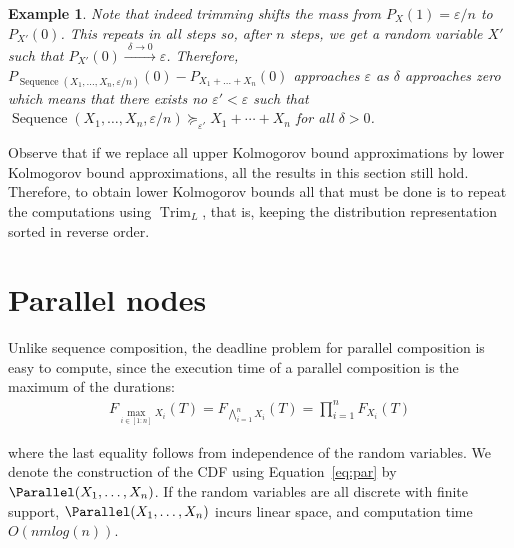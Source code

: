 \documentclass[review]{elsarticle}
\newtheorem{example}{Example}
\DeclareMathOperator{\Trim}{Trim}
\DeclareMathOperator{\Sequence}{Sequence}
\begin{document}
\begin{example}
	Note that indeed trimming shifts the mass from $P_X(1)=\varepsilon/n$ to $P_{X'}(0)$.
	This repeats in all steps so, after $n$ steps, we get a random variable $X'$ such that $P_{X'}(0) \xrightarrow{\,\,\delta \to 0\,\,} \varepsilon$. Therefore, 
	$P_{\Sequence(X_1,\dots,X_n,\varepsilon/n)}(0) {-} P_{X_1{+}\dots{+}X_n}(0)$
	approaches $\varepsilon$ as $\delta$ approaches zero
	which means that there exists no $\varepsilon' {<} \varepsilon$
	such that $\Sequence(X_1,\dots,X_n,\varepsilon/n) \succeq_{\varepsilon'} X_1 + \cdots + X_n$ for all $\delta >0$.
	
\end{example}

Observe that if we replace all upper Kolmogorov bound approximations by 
lower Kolmogorov bound approximations, all the results in this section
still hold. Therefore, to obtain lower Kolmogorov bounds all that must be
done is to repeat the computations using $\Trim_L$, that is, keeping
the distribution representation sorted in reverse order.


\section{Parallel nodes}\label{sec:par}


Unlike sequence composition, the deadline problem for parallel composition
is easy to compute, since the execution time of
a parallel composition is the maximum of the durations:
\begin{align}
F_{\max_{i\in[1:n]}X_i}(T)
{=}F_{\bigwedge_{i=1}^n X_i}(T) 
{=}\prod_{i=1}^n F_{X_i} (T)
\label{eq:par}
\end{align}

\noindent where the last equality follows from independence of the random variables.
We denote the construction of the CDF using Equation~\eqref{eq:par} by $\Parallel(X_1,\dots , X_n)$.
If the random variables  are all discrete with finite support, $\Parallel(X_1,\dots , X_n)$
incurs linear space, and computation time $O(nm log(n))$.
\end{document}
